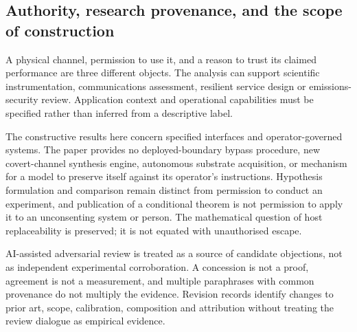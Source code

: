 \subsection{Authority, research provenance, and the scope of construction}\label{sec:governance}
A physical channel, permission to use it, and a reason to trust its claimed performance are three different objects. The analysis can support scientific instrumentation, communications assessment, resilient service design or emissions-security review. Application context and operational capabilities must be specified rather than inferred from a descriptive label.

The constructive results here concern specified interfaces and operator-governed systems. The paper provides no deployed-boundary bypass procedure, new covert-channel synthesis engine, autonomous substrate acquisition, or mechanism for a model to preserve itself against its operator's instructions. Hypothesis formulation and comparison remain distinct from permission to conduct an experiment, and publication of a conditional theorem is not permission to apply it to an unconsenting system or person. The mathematical question of host replaceability is preserved; it is not equated with unauthorised escape.

AI-assisted adversarial review is treated as a source of candidate objections, not as independent experimental corroboration. A concession is not a proof, agreement is not a measurement, and multiple paraphrases with common provenance do not multiply the evidence. Revision records identify changes to prior art, scope, calibration, composition and attribution without treating the review dialogue as empirical evidence.
